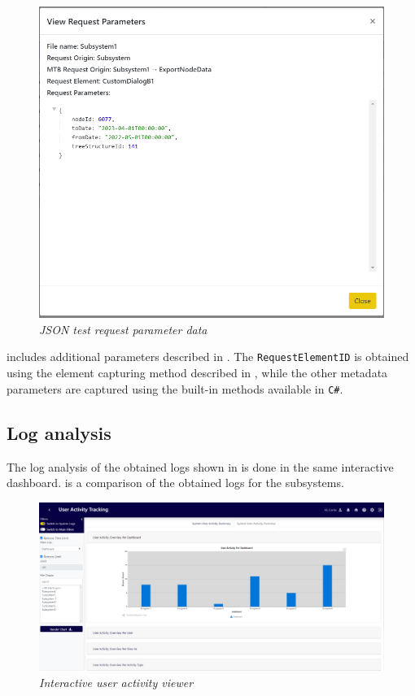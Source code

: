 \begin{figure}[!htb]
	\centering %
	\includegraphics[width=0.65\linewidth]{img/ch3/analysis/UAT_request_params.png}
	\caption[JSON test request parameter data]
	{\textit{JSON test request parameter data}}\label{fig:ch3_JSON_Test_Result}
\end{figure}

 includes additional parameters described in . The \texttt{RequestElementID} is obtained using the element capturing method described in , while the other metadata parameters are captured using the built-in methods available in \texttt{C\#}.

\subsection{Log analysis}
The log analysis of the obtained logs shown in  is done in the same interactive dashboard.  is a comparison of the obtained logs for the subsystems.

\begin{figure}[!htb]
	\centering %
	\includegraphics[width=0.99\linewidth]{img/ch3/analysis/UAT_menu_analysis.png}
	\caption[Interactive user activity viewer]
	{\textit{Interactive user activity viewer}}\label{fig:ch3_UAT_menuAnalysis}
\end{figure}

